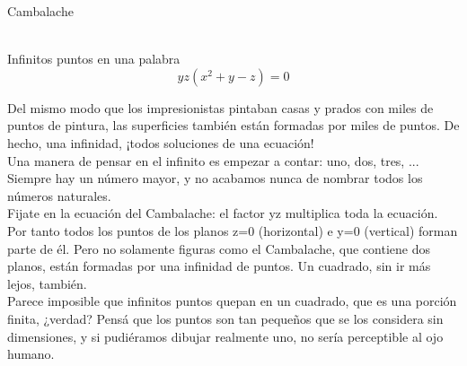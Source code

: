 \documentclass[es]{../../common/SurferDesc}%
\begin{document}
\footnotesize


\begin{surferPage}
  \begin{surferTitle}Cambalache \end{surferTitle}   \\
Infinitos puntos en una palabra\\
\smallskip
\[y z (x^2	+ y - z)	= 0\]

\vspace{0.3cm}
Del mismo modo que los impresionistas pintaban casas y prados con miles de puntos de pintura, las
superficies tambi\'en est\'an formadas por miles de puntos. De hecho, una infinidad, ¡todos soluciones de
una ecuaci\'on!\\
\vspace{0.3cm}
Una manera de pensar en el infinito es empezar a contar: uno, dos, tres, ... Siempre hay un n\'umero mayor, y no acabamos nunca de nombrar todos los n\'umeros naturales.\\
\vspace{0.3cm}
Fijate en la ecuaci\'on del Cambalache: el factor yz multiplica toda la ecuaci\'on. Por tanto todos los puntos
de los planos z=0 (horizontal) e y=0 (vertical) forman parte de \'el.
Pero no solamente figuras como el Cambalache, que contiene dos planos, est\'an formadas por una infinidad de
puntos. Un cuadrado, sin ir m\'as lejos, tambi\'en.\\
\vspace{0.3cm}
Parece imposible que infinitos puntos quepan en un cuadrado, que es una porci\'on finita, ¿verdad? Pens\'a
que los puntos son tan pequeños que se los considera sin dimensiones, y si pudi\'eramos dibujar realmente
uno, no ser\'ia perceptible al ojo humano.

  \begin{surferText}
     \end{surferText}
\end{surferPage}
\end{document}
